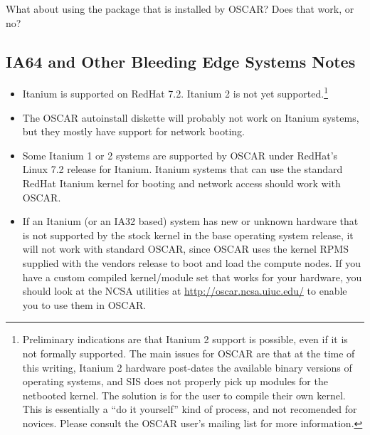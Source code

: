 \begin{itemize}
  \begin{discuss}
    What about using the  package that is
    installed by OSCAR?  Does that work, or no?
  \end{discuss}

\end{itemize}


\subsection{IA64 and Other Bleeding Edge Systems Notes}

\begin{itemize}
  
\item Itanium is supported on RedHat 7.2.  Itanium 2 is not yet
  supported.\footnote{Preliminary indications are that Itanium 2
    support is possible, even if it is not formally supported.  The
    main issues for OSCAR are that at the time of this writing,
    Itanium 2 hardware post-dates the available binary versions of
    operating systems, and SIS does not properly pick up modules for
    the netbooted kernel.  The solution is for the user to compile
    their own kernel.  This is essentially a ``do it yourself'' kind
    of process, and not recomended for novices.  Please consult the
    OSCAR user's mailing list for more information.}

\item The OSCAR autoinstall diskette will probably not work on Itanium
  systems, but they mostly have support for network booting.
  
\item Some Itanium 1 or 2 systems are supported by OSCAR under
  RedHat's Linux 7.2 release for Itanium.  Itanium systems that can
  use the standard RedHat Itanium kernel for booting and network
  access should work with OSCAR.
  
\item If an Itanium (or an IA32 based) system has new or unknown
  hardware that is not supported by the stock kernel in the base
  operating system release, it will not work with standard OSCAR,
  since OSCAR uses the kernel RPMS supplied with the vendors release
  to boot and load the compute nodes.  If you have a custom compiled
  kernel/module set that works for your hardware, you should look at
  the NCSA utilities at \url{http://oscar.ncsa.uiuc.edu/} to
  enable you to use them in OSCAR.
\end{itemize}





